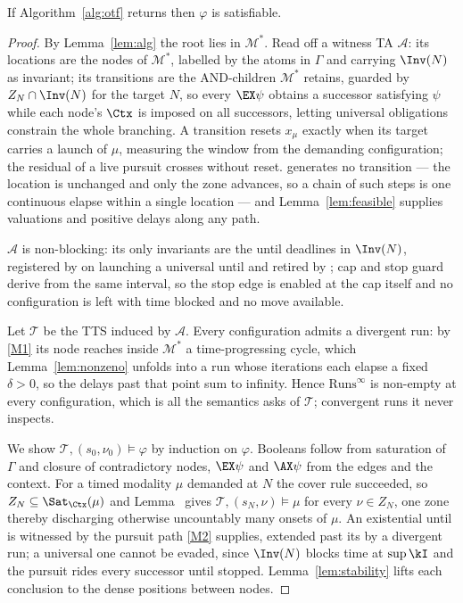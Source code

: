 \begin{theorem}[Soundness]\label{thm:soundness}
If Algorithm~\ref{alg:otf} returns \SAT{} then $\varphi$ is satisfiable.
\end{theorem}
\begin{proof}
By Lemma~\ref{lem:alg} the root lies in $\mathcal M^{*}$. Read off a witness TA $\mathcal A$: its
locations are the nodes of $\mathcal M^{*}$, labelled by the atoms in $\Gamma$ and carrying $\Inv(N)$
as invariant; its transitions are the AND-children $\mathcal M^{*}$ retains, guarded by
$Z_N\cap\Inv(N)$ for the target $N$, so every $\EX\psi$ obtains a successor satisfying $\psi$ while
each node's $\Ctx$ is imposed on all successors, letting universal obligations constrain the whole
branching. A transition resets $x_\mu$ exactly when its target carries a launch of $\mu$, measuring
the window from the demanding configuration; the residual of a live pursuit crosses without reset.
 generates no transition --- the location is unchanged and only the zone advances, so a
chain of such steps is one continuous elapse within a single location --- and Lemma~\ref{lem:feasible}
supplies valuations and positive delays along any path.

$\mathcal A$ is non-blocking: its only invariants are the until deadlines in $\Inv(N)$, registered by
 on launching a universal until and retired by ; cap and stop guard derive
from the same interval, so the stop edge is enabled at the cap itself and no configuration is left
with time blocked and no move available.

Let $\mathcal T$ be the TTS induced by $\mathcal A$. Every configuration admits a divergent run: by
\ref{M1} its node reaches inside $\mathcal M^{*}$ a time-progressing cycle, which
Lemma~\ref{lem:nonzeno} unfolds into a run whose iterations each elapse a fixed $\delta>0$, so the
delays past that point sum to infinity. Hence $\mathrm{Runs}^\infty$ is non-empty at every
configuration, which is all the semantics asks of $\mathcal T$; convergent runs it never inspects.

We show $\mathcal T,(s_0,\nu_0)\models\varphi$ by induction on $\varphi$. Booleans follow from
saturation of $\Gamma$ and closure of contradictory nodes, $\EX\psi$ and $\AX\psi$ from the edges and
the context. For a timed modality $\mu$ demanded at $N$ the cover rule succeeded, so
$Z_N\subseteq\Sat_{\Ctx}(\mu)$ and Lemma~ gives
$\mathcal T,(s_N,\nu)\models\mu$ for every $\nu\in Z_N$, one zone thereby discharging otherwise
uncountably many onsets of $\mu$. An existential until is witnessed by the pursuit path \ref{M2}
supplies, extended past its  by a divergent run; a universal one cannot be evaded,
since $\Inv(N)$ blocks time at $\sup\kI$ and the pursuit rides every successor until stopped.
Lemma~\ref{lem:stability} lifts each conclusion to the dense positions between nodes.
\end{proof}

